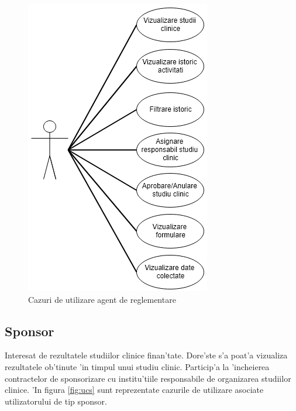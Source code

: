 \documentclass[12pt,a4paper,twoside]{report}
\begin{document}
	\begin{figure}[H]
		\begin{center}
			\includegraphics[scale=0.56]{img/uc_reg.PNG}
			\caption{Cazuri de utilizare agent de reglementare}
  			\label{fig:ucr}
  		\end{center}
  	\end{figure}

\subsection{Sponsor} 
    Interesat de rezultatele studiilor clinice finan'tate. Dore'ste s'a poat'a vizualiza rezultatele ob'tinute 'in timpul unui studiu clinic. Particip'a la 'incheierea contractelor de sponsorizare cu institu'tiile responsabile de organizarea studiilor clinice. 'In figura \ref{fig:ucs} sunt reprezentate cazurile de utilizare asociate utilizatorului de tip sponsor.
\end{document}
